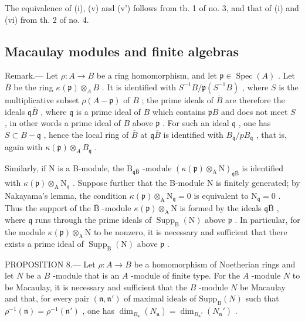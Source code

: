 The equivalence of (i), (v) and (v') follows from th. 1 of no. 3, and that of (i) and (vi) from th. 2 of no. 4.

\subsection{Macaulay modules and finite algebras}

Remark.--- Let \(\rho: A \to B\) be a ring homomorphism, and let \(\mathfrak{p} \in \operatorname{Spec}(A)\) . Let \(\overline{B}\) be the ring \(\kappa(\mathfrak{p}) \otimes_{A} B\) . It is identified with \(S^{-1}B/\mathfrak{p}(S^{-1}B)\) , where \(S\) is the multiplicative subset \(\rho(A - \mathfrak{p})\) of \(B\) ; the prime ideals of \(\overline{B}\) are therefore the ideals \(\mathfrak{q}\overline{B}\) , where \(\mathfrak{q}\) is a prime ideal of \(B\) which contains \(\mathfrak{p}B\) and does not meet \(S\) , in other words a prime ideal of \(B\) above \(\mathfrak{p}\) . For such an ideal \(\mathfrak{q}\) , one has \(S \subset B - \mathfrak{q}\) , hence the local ring of \(\overline{B}\) at \(\mathfrak{q}\overline{B}\) is identified with \(B_{\mathfrak{q}}/pB_{\mathfrak{q}}\) , that is, again with \(\kappa(\mathfrak{p}) \otimes_{A} B_{\mathfrak{q}}\) .

Similarly, if N is a B-module, the \(\overline{\mathrm{B}}_{\mathfrak{q}\overline{\mathrm{B}}}\) -module \(\left(\kappa(\mathfrak{p})\otimes_{\mathrm{A}}\mathrm{N}\right)_{\mathfrak{q}\overline{\mathrm{B}}}\) is identified with \(\kappa(\mathfrak{p})\otimes_{\mathrm{A}}\mathrm{N}_{\mathfrak{q}}\) . Suppose further that the B-module N is finitely generated; by Nakayama's lemma, the condition \(\kappa(\mathfrak{p})\otimes_{\mathrm{A}}\mathrm{N}_{\mathfrak{q}}=0\) is equivalent to \(\mathrm{N}_{\mathfrak{q}}=0\) . Thus the support of the \(\overline{\mathrm{B}}\) -module \(\kappa(\mathfrak{p})\otimes_{\mathrm{A}}\mathrm{N}\) is formed by the ideals \(\mathfrak{q}\overline{\mathrm{B}}\) , where \(\mathfrak{q}\) runs through the prime ideals of \(\operatorname{Supp}_{\mathrm{B}}(\mathrm{N})\) above \(\mathfrak{p}\) . In particular, for the module \(\kappa(\mathfrak{p})\otimes_{\mathrm{A}}\mathrm{N}\) to be nonzero, it is necessary and sufficient that there exists a prime ideal of \(\operatorname{Supp}_{\mathrm{B}}(\mathrm{N})\) above \(\mathfrak{p}\) .

PROPOSITION 8.--- Let \(\rho: A \to B\) be a homomorphism of Noetherian rings and let \(N\) be a \(B\) -module that is an \(A\) -module of finite type. For the \(A\) -module \(N\) to be Macaulay, it is necessary and sufficient that the \(B\) -module \(N\) be Macaulay and that, for every pair \((\mathfrak{n}, \mathfrak{n}')\) of maximal ideals of \(\mathrm{Supp}_{\mathrm{B}}(N)\) such that \(\rho^{-1}(\mathfrak{n}) = \rho^{-1}(\mathfrak{n}')\) , one has \(\dim_{B_{\mathfrak{n}}} (N_{\mathfrak{n}}) = \dim_{B_{\mathfrak{n}}'} (N_{\mathfrak{n}}')\) .

